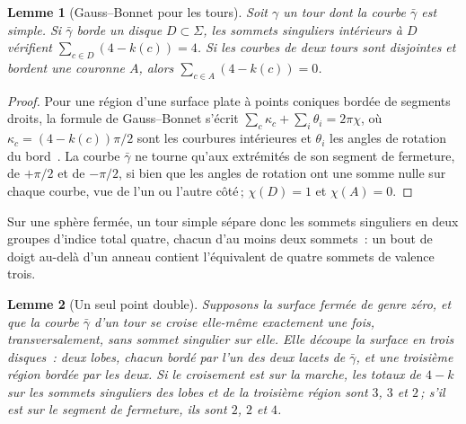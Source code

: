 \documentclass[11pt,a4paper]{article}
\newtheorem{lemma}{Lemme}
\newcommand{\lean}[1]{\texttt{\detokenize{#1}}}
\newenvironment{evidence}[3][]{}{}
\begin{document}
\begin{evidence}{core}{\lean{gauss_bonnet_turn}, \lean{gauss_bonnet}\,; testé~: 3\,833 régions de strips simples sur 50 instances aléatoires, 35 sphères et 15 tores\,; supposé~: la courbe borde un disque (ou une couronne) de quads}
\begin{lemma}[Gauss--Bonnet pour les tours]\label{lem:gauss}
Soit $\gamma$ un tour dont la courbe $\bar\gamma$ est simple. Si $\bar\gamma$
borde un disque $D \subset \Sigma$, les sommets singuliers intérieurs à $D$
vérifient $\sum_{c \in D} (4 - k(c)) = 4$. Si les courbes de deux tours sont
disjointes et bordent une couronne $A$, alors $\sum_{c \in A} (4 - k(c)) =
0$.
\end{lemma}
\end{evidence}

\begin{proof}
Pour une région d'une surface plate à points coniques bordée de segments
droits, la formule de Gauss--Bonnet s'écrit $\sum_c \kappa_c + \sum_i
\theta_i = 2\pi\chi$, où $\kappa_c = (4 - k(c))\pi/2$ sont les courbures
intérieures et $\theta_i$ les angles de rotation du
bord~\cite{bommes2013survey}. La courbe $\bar\gamma$ ne tourne qu'aux
extrémités de son segment de fermeture, de $+\pi/2$ et de $-\pi/2$, si bien
que les angles de rotation ont une somme nulle sur chaque courbe, vue de l'un
ou l'autre côté\,; $\chi(D) = 1$ et $\chi(A) = 0$.
\end{proof}

Sur une sphère fermée, un tour simple sépare donc les sommets singuliers en
deux groupes d'indice total quatre, chacun d'au moins deux sommets~: un bout
de doigt au-delà d'un anneau contient l'équivalent de quatre sommets de
valence trois.

\begin{evidence}{core}{\lean{one_crossing_on_walk}, \lean{one_crossing_on_segment}\,; testé~: 42 points doubles sur les sphères de 50 instances aléatoires\,; supposé~: les régions coupées au point double sont des disques, et lesquels de leurs coins sont convexes}
\begin{lemma}[Un seul point double]\label{lem:eight}
Supposons la surface fermée de genre zéro, et que la courbe $\bar\gamma$ d'un
tour se croise elle-même exactement une fois, transversalement, sans sommet
singulier sur elle. Elle découpe la surface en trois disques~: deux
\emph{lobes}, chacun bordé par l'un des deux lacets de $\bar\gamma$, et une
troisième région bordée par les deux. Si le croisement est sur la marche, les
totaux de $4 - k$ sur les sommets singuliers des lobes et de la troisième
région sont $3$, $3$ et $2$\,; s'il est sur le segment de fermeture, ils sont
$2$, $2$ et $4$.
\end{lemma}
\end{evidence}
\end{document}
